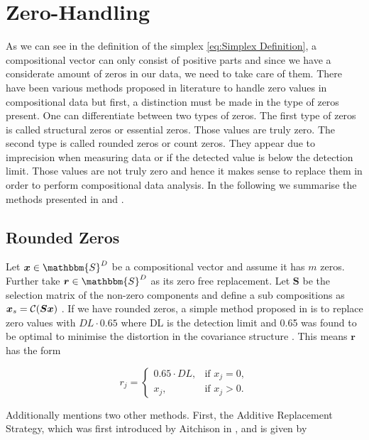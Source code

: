 \section{Zero-Handling}
\label{sec: Zero-Handling}

As we can see in the definition of the simplex \ref{eq:Simplex Definition}, a compositional vector can only consist of positive parts and since we have a considerate amount of zeros in our data, we need to take care of them. There have been various methods proposed in literature to handle zero values in compositional data but first, a distinction must be made in the type of zeros present. One can differentiate between two types of zeros. The first type of zeros is called structural zeros or essential zeros. Those values are truly zero. The second type is called rounded zeros or count zeros. They appear due to imprecision when measuring data or if the detected value is below the detection limit. Those values are not truly zero and hence it makes sense to replace them in order to perform compositional data analysis. In the following we summarise the methods presented in \cite{Lubbe:2021} and \cite{Josep:2003}. 

\subsection{Rounded Zeros}
\label{sec:Rounded Zeros}

Let $\bm{x} \in \mathbbm{S}^D$ be a compositional vector and assume it has $m$ zeros. Further take $\bm{r} \in \mathbbm{S}^D$ as its zero free replacement. Let $\bm{S}$ be the selection matrix of the non-zero components and define a sub compositions as $\bm{x}_s=\mathcal{C}(\bm{Sx})$ . If we have rounded zeros, a simple method proposed in \cite{Josep:2003} is to replace zero values with $DL \cdot 0.65$ where DL is the detection limit and 0.65 was found to be optimal to minimise the distortion in the covariance structure \cite{Lubbe:2021}. This means $\bm{r}$ has the form

\begin{equation}
r_j = 
\begin{cases}
0.65\cdot DL, & \text{if } x_j=0, \\
x_j, & \text{if } x_j>0.
\end{cases}
\label{eq:DL065}
\end{equation}

Additionally \cite{Josep:2003} mentions two other methods. First, the Additive Replacement Strategy, which was first introduced by Aitchison in \cite{Aitchison:1986}, and is given by

